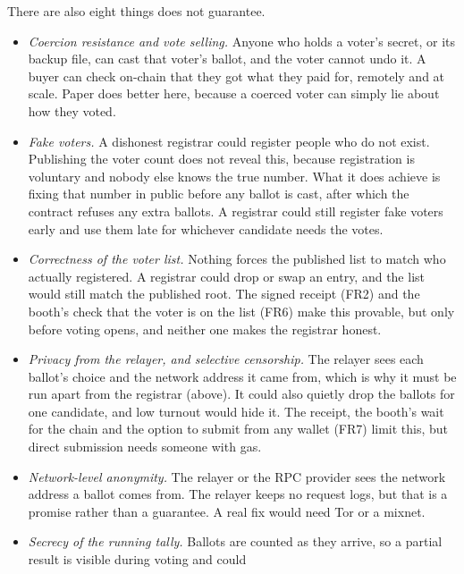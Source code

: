 There are also eight things \projectname{} does not guarantee.

\begin{itemize}
  \item \emph{Coercion resistance and vote selling.} Anyone who holds a voter's
        secret, or its backup file, can cast that voter's ballot, and the voter
        cannot undo it. A buyer can check on-chain that they got what they paid
        for, remotely and at scale. Paper does better here, because a coerced
        voter can simply lie about how they voted.
  \item \emph{Fake voters.} A dishonest registrar could register people who do
        not exist. Publishing the voter count does not reveal this, because
        registration is voluntary and nobody else knows the true number. What
        it does achieve is fixing that number in public before any ballot is
        cast, after which the contract refuses any extra ballots. A registrar
        could still register fake voters early and use them late for whichever
        candidate needs the votes.
  \item \emph{Correctness of the voter list.} Nothing forces the published list
        to match who actually registered. A registrar could drop or swap an
        entry, and the list would still match the published root. The signed
        receipt (FR2) and the booth's check that the voter is on the list (FR6)
        make this provable, but only before voting opens, and neither one makes
        the registrar honest.
  \item \emph{Privacy from the relayer, and selective censorship.} The relayer
        sees each ballot's choice and the network address it came from, which
        is why it must be run apart from the registrar (above). It could also
        quietly drop the ballots for one candidate, and low turnout would hide
        it. The
        receipt, the booth's wait for the chain and the option to submit from
        any wallet (FR7) limit this, but direct submission needs someone with
        gas.
  \item \emph{Network-level anonymity.} The relayer or the RPC provider sees the
        network address a ballot comes from. The relayer keeps no request logs,
        but that is a promise rather than a guarantee. A real fix would need
        Tor or a mixnet.
  \item \emph{Secrecy of the running tally.} Ballots are counted as they
        arrive, so a partial result is visible during voting and could

\end{itemize}
